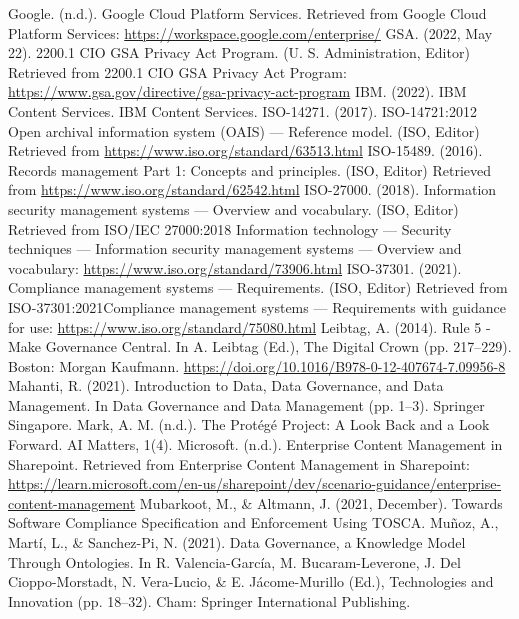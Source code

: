 \documentclass[runningheads]{llncs}
\begin{document}
\begin{thebibliography}{8}
 Google. (n.d.). Google Cloud Platform Services. Retrieved from Google Cloud Platform Services: \url{https://workspace.google.com/enterprise/}
 GSA. (2022, May 22). 2200.1 CIO GSA Privacy Act Program. (U. S. Administration, Editor) Retrieved from 2200.1 CIO GSA Privacy Act Program: \url{https://www.gsa.gov/directive/gsa-privacy-act-program}
 IBM. (2022). IBM Content Services. IBM Content Services.
 ISO-14271. (2017). ISO-14721:2012 Open archival information system (OAIS) — Reference model. (ISO, Editor) Retrieved from \url{https://www.iso.org/standard/63513.html}
 ISO-15489. (2016). Records management Part 1: Concepts and principles. (ISO, Editor) Retrieved from \url{https://www.iso.org/standard/62542.html}
 ISO-27000. (2018). Information security management systems — Overview and vocabulary. (ISO, Editor) Retrieved from ISO/IEC 27000:2018 Information technology — Security techniques — Information security management systems — Overview and vocabulary: \url{https://www.iso.org/standard/73906.html}
 ISO-37301. (2021). Compliance management systems — Requirements. (ISO, Editor) Retrieved from ISO-37301:2021Compliance management systems — Requirements with guidance for use: \url{https://www.iso.org/standard/75080.html}
 Leibtag, A. (2014). Rule 5 - Make Governance Central. In A. Leibtag (Ed.), The Digital Crown (pp. 217–229). Boston: Morgan Kaufmann. \url{https://doi.org/10.1016/B978-0-12-407674-7.09956-8}
 Mahanti, R. (2021). Introduction to Data, Data Governance, and Data Management. In Data Governance and Data Management (pp. 1–3). Springer Singapore. 
 Mark, A. M. (n.d.). The Protégé Project: A Look Back and a Look Forward. AI Matters, 1(4). 
 Microsoft. (n.d.). Enterprise Content Management in Sharepoint. Retrieved from Enterprise Content Management in Sharepoint: \url{https://learn.microsoft.com/en-us/sharepoint/dev/scenario-guidance/enterprise-content-management}
 Mubarkoot, M., \& Altmann, J. (2021, December). Towards Software Compliance Specification and Enforcement Using TOSCA. 
 Muñoz, A., Martí, L., \& Sanchez-Pi, N. (2021). Data Governance, a Knowledge Model Through Ontologies. In R. Valencia-García, M. Bucaram-Leverone, J. Del Cioppo-Morstadt, N. Vera-Lucio, \& E. Jácome-Murillo (Ed.), Technologies and Innovation (pp. 18–32). Cham: Springer International Publishing.

\end{thebibliography}
\end{document}
